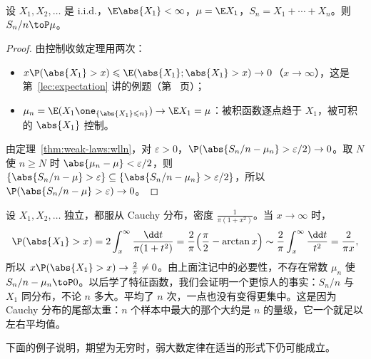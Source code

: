 \begin{theorem}\label{thm:weak-laws:khinchin}
设 $X_1,X_2,\dots$ 是 i.i.d.，$\E\abs{X_1}<\infty$，$\mu=\E X_1$，$S_n=X_1+\cdots+X_n$。则 $S_n/n\toP\mu$。
\end{theorem}
\begin{proof}
由控制收敛定理用两次：
\begin{itemize}
\item $x\P(\abs{X_1}>x)\leqslant \E(\abs{X_1};\abs{X_1}>x)\to0$（$x\to\infty$），这是第~\ref{lec:expectation} 讲的例题（第~\pageref{we:expectation:tP} 页）；
\item $\mu_n=\E(X_1\one_{\{\abs{X_1}\leqslant n\}})\to \E X_1=\mu$：被积函数逐点趋于 $X_1$，被可积的 $\abs{X_1}$ 控制。
\end{itemize}
由定理~\ref{thm:weak-laws:wlln}，对 $\varepsilon>0$，$\P(\abs{S_n/n-\mu_n}>\varepsilon/2)\to0$。取 $N$ 使 $n\geqslant N$ 时 $\abs{\mu_n-\mu}<\varepsilon/2$，则 $\{\abs{S_n/n-\mu}>\varepsilon\}\subseteq\{\abs{S_n/n-\mu_n}>\varepsilon/2\}$，所以 $\P(\abs{S_n/n-\mu}>\varepsilon)\to0$。
\end{proof}

\begin{example}\label{ex:weak-laws:cauchy}
设 $X_1,X_2,\dots$ 独立，都服从 Cauchy 分布，密度 $\frac1{\pi(1+x^2)}$。当 $x\to\infty$ 时，
\[
\P(\abs{X_1}>x)=2\int_x^\infty\frac{\dd t}{\pi(1+t^2)}=\frac2\pi\Bigl(\frac\pi2-\arctan x\Bigr)\sim\frac2\pi\int_x^\infty\frac{\dd t}{t^2}=\frac2{\pi x},
\]
所以 $x\P(\abs{X_1}>x)\to\frac2\pi\neq0$。由上面注记中的必要性，不存在常数 $\mu_n$ 使 $S_n/n-\mu_n\toP0$。以后学了特征函数，我们会证明一个更惊人的事实：$S_n/n$ 与 $X_1$ 同分布，不论 $n$ 多大。平均了 $n$ 次，一点也没有变得更集中。这是因为 Cauchy 分布的尾部太重：$n$ 个样本中最大的那个大约是 $n$ 的量级，它一个就足以左右平均值。
\end{example}

下面的例子说明，期望为无穷时，弱大数定律在适当的形式下仍可能成立。

